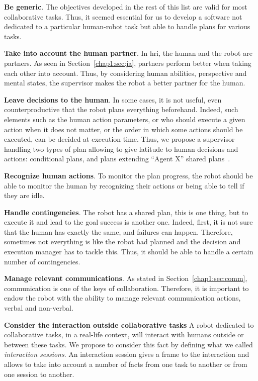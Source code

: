 \documentclass[a4paper,11pt,twoside]{StyleThese}
\begin{document}
\begin{bulletList}
	\item \textbf{Be generic}. The objectives developed in the rest of this list are valid for most collaborative tasks. Thus, it seemed essential for us to develop a software not dedicated to a particular human-robot task but able to handle plans for various tasks. 
	\item \textbf{Take into account the human partner}. In \acrshort{hri}, the human and the robot are partners. As seen in Section~\ref{chap1:sec:ja}, partners perform better when taking each other into account. Thus, by considering human abilities, perspective and mental states, the supervisor makes the robot a better partner for the human.
	\item \textbf{Leave decisions to the human}. In some cases, it is not useful, even counterproductive that the robot plans everything beforehand. Indeed, such elements such as the human action parameters, or who should execute a given action when it does not matter, or the order in which some actions should be executed, can be decided at execution time. Thus, we propose a supervisor handling two types of plan allowing to give latitude to human decisions and actions: conditional plans, and plans extending ``Agent X'' shared plans~\citep{devin_2017_decisions}.
	\item \textbf{Recognize human actions}. To monitor the plan progress, the robot should be able to monitor the human by recognizing their actions or being able to tell if they are idle.
	\item \textbf{Handle contingencies}. The robot has a shared plan, this is one thing, but to execute it and lead to the goal success is another one. Indeed, first, it is not sure that the human has exactly the same, and failures can happen. Therefore, sometimes not everything is like the robot had planned and the decision and execution manager has to tackle this. Thus, it should be able to handle a certain number of contingencies.
	\item \textbf{Manage relevant communications}. As stated in Section~\ref{chap1:sec:comm}, communication is one of the keys of collaboration. Therefore, it is important to endow the robot with the ability to manage relevant communication actions, verbal and non-verbal.
	\item \textbf{Consider the interaction outside collaborative tasks} A robot dedicated to collaborative tasks, in a real-life context, will interact with humans outside or between these tasks. We propose to consider this fact by defining what we called \textit{interaction sessions}. An interaction session gives a frame to the interaction and allows to take into account a number of facts from one task to another or from one session to another.

\end{bulletList}
\end{document}
